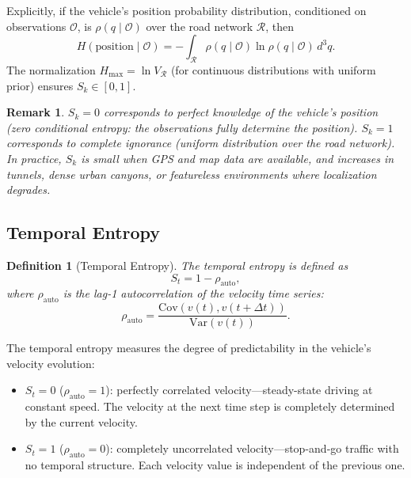 \documentclass[twocolumn,10pt]{article}
\newtheorem{definition}[theorem]{Definition}
\newtheorem{remark}[theorem]{Remark}
\newcommand{\Sk}{S_k}
\newcommand{\St}{S_t}
\newcommand{\Hmax}{H_{\mathrm{max}}}
\begin{document}
Explicitly, if the vehicle's position probability distribution, conditioned on observations $\mathcal{O}$, is $\rho(q \mid \mathcal{O})$ over the road network $\mathcal{R}$, then
\begin{equation}
H(\text{position} \mid \mathcal{O}) = -\int_{\mathcal{R}} \rho(q \mid \mathcal{O}) \ln \rho(q \mid \mathcal{O})\, d^3q.
\end{equation}
The normalization $\Hmax = \ln V_{\mathcal{R}}$ (for continuous distributions with uniform prior) ensures $\Sk \in [0,1]$.

\begin{remark}
$\Sk = 0$ corresponds to perfect knowledge of the vehicle's position (zero conditional entropy: the observations fully determine the position). $\Sk = 1$ corresponds to complete ignorance (uniform distribution over the road network). In practice, $\Sk$ is small when GPS and map data are available, and increases in tunnels, dense urban canyons, or featureless environments where localization degrades.
\end{remark}

\subsection{Temporal Entropy}

\begin{definition}[Temporal Entropy]\label{def:St}
The temporal entropy is defined as
\begin{equation}\label{eq:St}
\St = 1 - \rho_{\mathrm{auto}},
\end{equation}
where $\rho_{\mathrm{auto}}$ is the lag-1 autocorrelation of the velocity time series:
\begin{equation}
\rho_{\mathrm{auto}} = \frac{\mathrm{Cov}(v(t), v(t+\Delta t))}{\mathrm{Var}(v(t))}.
\end{equation}
\end{definition}

The temporal entropy measures the degree of predictability in the vehicle's velocity evolution:
\begin{itemize}
    \item $\St = 0$ ($\rho_{\mathrm{auto}} = 1$): perfectly correlated velocity---steady-state driving at constant speed. The velocity at the next time step is completely determined by the current velocity.
    \item $\St = 1$ ($\rho_{\mathrm{auto}} = 0$): completely uncorrelated velocity---stop-and-go traffic with no temporal structure. Each velocity value is independent of the previous one.
\end{itemize}
\end{document}
